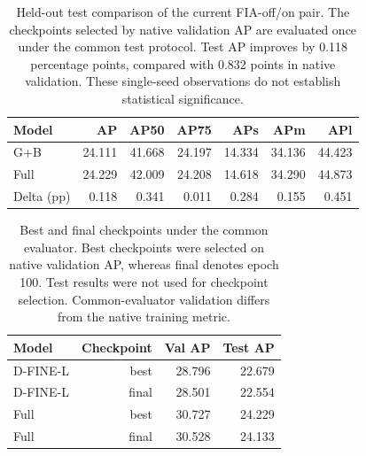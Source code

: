 \begin{table}[t]
\centering
\small
\caption{Held-out test comparison of the current FIA-off/on pair. The checkpoints selected by native validation AP are evaluated once under the common test protocol. Test AP improves by 0.118 percentage points, compared with 0.832 points in native validation. These single-seed observations do not establish statistical significance.}
\label{tab:s1}
\begin{tabular}{lrrrrrr}
\toprule
Model & AP & AP50 & AP75 & APs & APm & APl \\
\midrule
G+B & 24.111 & 41.668 & 24.197 & 14.334 & 34.136 & 44.423 \\
Full & 24.229 & 42.009 & 24.208 & 14.618 & 34.290 & 44.873 \\
Delta (pp) & 0.118 & 0.341 & 0.011 & 0.284 & 0.155 & 0.451 \\
\bottomrule
\end{tabular}
\end{table}

\begin{table}[t]
\centering
\small
\caption{Best and final checkpoints under the common evaluator. Best checkpoints were selected on native validation AP, whereas final denotes epoch 100. Test results were not used for checkpoint selection. Common-evaluator validation differs from the native training metric.}
\label{tab:s2}
\begin{tabular}{lrrr}
\toprule
Model & Checkpoint & Val AP & Test AP \\
\midrule
D-FINE-L & best & 28.796 & 22.679 \\
D-FINE-L & final & 28.501 & 22.554 \\
Full & best & 30.727 & 24.229 \\
Full & final & 30.528 & 24.133 \\
\bottomrule
\end{tabular}
\end{table}
